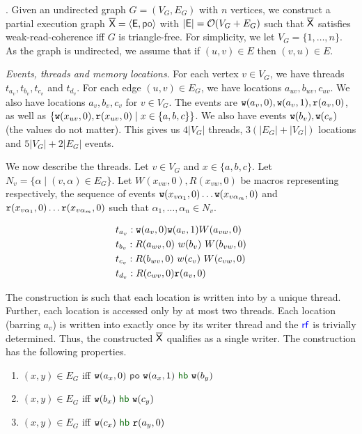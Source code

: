 
. Given an undirected graph $G = (V_G, E_G)$ with $n$ vertices, we construct a partial execution graph $\expartial = \tup{\E, \po}$ with $|\mathsf{E}|=\mathcal{O}(V_G+E_G)$ such that $\overline{\mathsf{\color{black}X}}$ satisfies weak-read-coherence iff $G$ is triangle-free.
For simplicity, we let $V_G=\{1,\dots, n\}$. As the graph is undirected, we assume that if $(u,v) \in E$ then $(v, u) \in E$.

\smallskip 
\noindent \emph{Events, threads  and memory locations}. For each  vertex $v \in V_G$, we have threads $t_{a_v}, t_{b_v}, t_{c_v}$ and $t_{d_v}$. 
For each edge $(u,v) \in E_G$, we have locations $a_{uv}, b_{uv}, c_{uv}$. We also have locations $a_v, b_v, c_v$ for $v \in V_G$. 
The events are $\mathtt{w}(a_v,0), \mathtt{w}(a_v,1), \mathtt{r}(a_v, 0)$, as well as $\{\mathtt{w}(x_{uv},0), \mathtt{r}(x_{uv},0) \mid x \in \{a,b,c\}\}$. 
We also have events $\mathtt{w}(b_v),\mathtt{w}(c_v)$ (the values do not matter).  
This gives us $4|V_G|$ threads, $3(|E_G|+|V_G|)$ locations and $5|V_G|+2|E_G|$ events. 

We now describe the threads. 
Let $v \in V_G$ and $x \in \{a,b, c\}$. Let $N_v=\{\alpha \mid (v, \alpha) \in E_G\}$.
Let $W(x_{vw},0), R(x_{vw},0)$ be  macros representing respectively, 
the sequence of events $\mathtt{w}(x_{v\alpha_1},0) \dots \mathtt{w}(x_{v\alpha_m},0)$ 
and $\mathtt{r}(x_{v\alpha_1},0) \dots \mathtt{r}(x_{v\alpha_m},0)$ such that 
$\alpha_1, \dots, \alpha_n \in N_v$. 

\begin{align*}
& t_{a_v}: \mathtt{w}(a_v,0) \mathtt{w}(a_v,1) W(a_{vw},0) \\
& t_{b_v}: R(a_{wv},0) ~w(b_v)~ W(b_{vw},0) \\
& t_{c_v}: R(b_{wv},0)~w(c_v)~W(c_{vw},0) \\
& t_{d_v}: R(c_{wv},0)\mathtt{r}(a_v,0)
\end{align*}


The construction is such that each location is written into by a unique thread. Further, each location is accessed only by at most two threads. Each location (barring $a_v$) is written into exactly once by its writer thread and the $\rf$ is trivially determined. Thus, the constructed $\overline{\mathsf{\color{black}X}}$ qualifies as a single writer. 
The construction has the following properties. 
\begin{enumerate}
    \item $(x, y) \in E_G$ iff $\wt(a_{x},0)~\po~\wt(a_{x},1)~\hb~\wt(b_{y})$
    \item $(x, y) \in E_G$ iff $\wt(b_{x})~\hb~\wt(c_{y})$
    \item $(x, y) \in E_G$ iff $\wt(c_{x})~\hb~\rd(a_{y},0)$
\end{enumerate}


